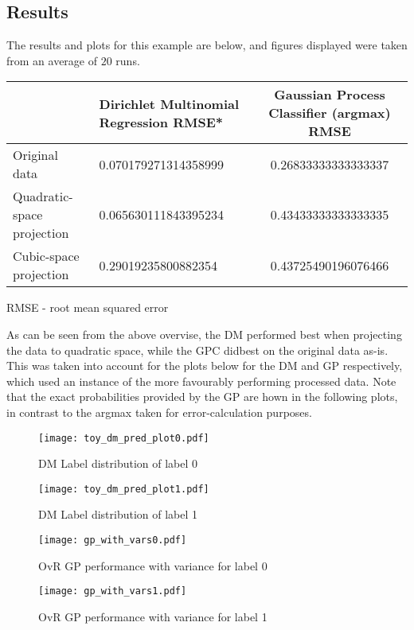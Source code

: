 \subsection{Results}

The results and plots for this example are below, and figures displayed were taken from an average of $20$ runs.

\begin{table}[H]
    \label{table:toy_gm_vs_gp}
    \begin{tabular}{|C{4cm}|C{4cm}|c|}
        \hline
        & Dirichlet Multinomial Regression RMSE* & Gaussian Process Classifier (argmax) RMSE \\\hline
        Original data & 0.070179271314358999 & 0.26833333333333337 \\\hline
        Quadratic-space projection & 0.065630111843395234 & 0.43433333333333335 \\\hline
        Cubic-space projection & 0.29019235800882354 & 0.43725490196076466 \\\hline
    \end{tabular}
    \begingroup
    \tiny{RMSE - root mean squared error}
    \endgroup
\end{table}

As can be seen from the above overvise, the DM performed best when projecting the data to quadratic space, while the GPC didbest on the original data as-is. This was taken into account for the plots below for the DM and GP respectively, which used an instance of the more favourably performing processed data. Note that the exact probabilities provided by the GP are hown in the following plots, in contrast to the argmax taken for error-calculation purposes. 

\begin{figure}[H]
    \texttt{[image: toy\_dm\_pred\_plot0.pdf]}
    \caption{DM Label distribution of label 0}
    \label{fig:toylabel0}
\end{figure}
\begin{figure}[H]
    \texttt{[image: toy\_dm\_pred\_plot1.pdf]}
    \caption{DM Label distribution of label 1}
    \label{fig:toylabel1}
\end{figure} 

\begin{figure}[H]
    \texttt{[image: gp\_with\_vars0.pdf]}
    \caption{OvR GP performance with variance for label 0}
    \label{fig:toylabel0}
\end{figure}
\begin{figure}[H]
    \texttt{[image: gp\_with\_vars1.pdf]}
    \caption{OvR GP performance with variance for label 1}
    \label{fig:toylabel1}
\end{figure} 

